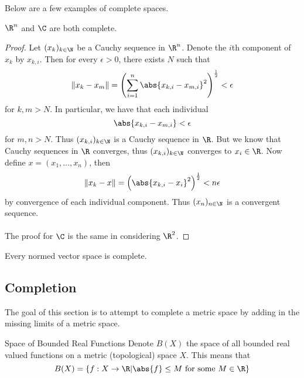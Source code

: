 Below are a few examples of complete spaces. 

\begin{prp}{}{} $\R^n$ and $\C$ are both complete. \tcbline
\begin{proof}
Let $(x_k)_{k\in\N}$ be a Cauchy sequence in $\R^n$. Denote the $i$th component of $x_k$ by $x_{k,i}$. Then for every $\epsilon>0$, there exists $N$ such that $$\|x_k-x_m\|=\left(\sum_{i=1}^n\abs{x_{k,i}-x_{m,i}}^2\right)^{\frac{1}{2}}<\epsilon$$ for $k,m>N$. In particular, we have that each individual $$\abs{x_{k,i}-x_{m,i}}<\epsilon$$ for $m,n>N$. Thus $(x_{k,i})_{k\in\N}$ is a Cauchy sequence in $\R$. But we know that Cauchy sequences in $\R$ converges, thus $(x_{k,i})_{k\in\N}$ converges to $x_i\in\R$. Now define $x=(x_1,\dots,x_n)$, then $$\|x_k-x\|=\left(\abs{x_{k,i}-x_i}^2\right)^{\frac{1}{2}}<n\epsilon$$ by convergence of each individual component. Thus $(x_n)_{n\in\N}$ is a convergent sequence. \\~\\
The proof for $\C$ is the same in considering $\R^2$. 
\end{proof}
\end{prp}

\begin{prp}{}{} Every normed vector space is complete. 
\end{prp}

\subsection{Completion}
The goal of this section is to attempt to complete a metric space by adding in the missing limits of a metric space. 

\begin{defn}{Space of Bounded Real Functions}{} Denote $B(X)$ the space of all bounded real valued functions on a metric (topological) space $X$. This means that $$B(X)=\{f:X\to\R|\abs{f}\leq M\text{ for some }M\in\R\}$$
\end{defn}

